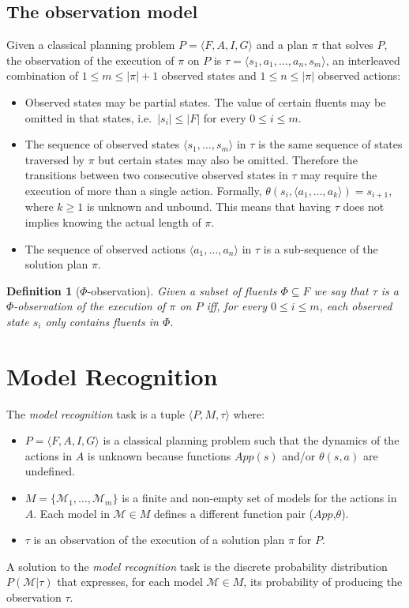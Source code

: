 \documentclass[letterpaper]{article} %
\newcommand{\tup}[1]{{\langle #1 \rangle}}
\newtheorem{definition}[theorem]{Definition}
\begin{document}
\subsection{The observation model}
Given a classical planning problem $P=\tup{F,A,I,G}$ and a plan $\pi$ that solves $P$, the observation of the execution of  $\pi$ on $P$ is $\tau=\tup{s_1, a_1, \ldots , a_n, s_m}$, an interleaved combination of {\small $1\leq m\leq |\pi|+1$} observed states and {\small $1\leq n\leq |\pi|$} observed actions:
\begin{itemize}
\item Observed states may be partial states. The value of certain fluents may be omitted in that states, i.e.~$|s_i|\leq |F|$ for every $0\leq i\leq m$.

\item The sequence of observed states $\tup{s_1, \ldots, s_m}$ in $\tau$ is the same sequence of states traversed by $\pi$ but certain states may also be omitted. Therefore the transitions between two consecutive observed states in $\tau$ may require the execution of more than a single action. Formally, $\theta(s_i,\tup{a_1,\ldots,a_k})=s_{i+1}$, where $k\geq 1$ is unknown and unbound. This means that having $\tau$ does not implies knowing the actual length of $\pi$.
\item The sequence of observed actions $\tup{a_1, \ldots, a_n}$ in $\tau$ is a sub-sequence of the solution plan $\pi$.
\end{itemize}

\begin{definition}[$\Phi$-observation]
Given a subset of fluents $\Phi\subseteq F$ we say that $\tau$ is a $\Phi$-observation of the execution of $\pi$ on $P$ iff, for every $0\leq i\leq m$, each observed state $s_i$ only contains fluents in $\Phi$.
\end{definition}



\section{Model Recognition}
\label{sec:recognition}
The {\em model recognition} task is a tuple $\tup{P,M,\tau}$ where:
\begin{itemize}
\item $P=\tup{F,A,I,G}$ is a classical planning problem such that the dynamics of the actions in $A$ is unknown because functions $App(s)$ and/or $\theta(s,a)$ are undefined.
\item $M=\{\mathcal{M}_1,\ldots,\mathcal{M}_m\}$ is a finite and non-empty set of models for the actions in $A$. Each model in $\mathcal{M}\in M$ defines a different function pair ($App$,$\theta$).
\item $\tau$ is an observation of the execution of a solution plan $\pi$ for $P$.
\end{itemize}
A solution to the {\em model recognition} task is the discrete probability distribution $P(\mathcal{M}|\tau)$ that expresses, for each model $\mathcal{M}\in M$, its probability of producing the observation $\tau$.
\end{document}
